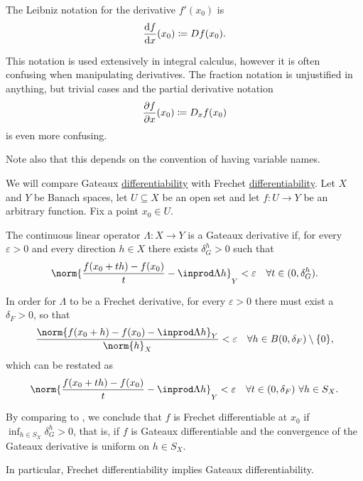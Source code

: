 \begin{remark}
\begin{thmenum}
     The Leibniz notation for the derivative \( f'(x_0) \) is
    \begin{equation*}
      \diff f x (x_0) \coloneqq D f(x_0).
    \end{equation*}

    This notation is used extensively in integral calculus, however it is often confusing when manipulating derivatives. The fraction notation is unjustified in anything, but trivial cases and the partial derivative notation
    \begin{equation*}
      \diffp f x (x_0) \coloneqq D_x f(x_0)
    \end{equation*}
    is even more confusing.

    Note also that this depends on the convention of having variable names.
  \end{thmenum}
\end{remark}

\begin{remark}\label{rem:gateaux_vs_frechet}
  We will compare Gateaux \hyperref[def:differentiability/gateaux]{differentiability} with Frechet \hyperref[def:differentiability/frechet]{differentiability}. Let \( X \) and \( Y \) be Banach spaces, let \( U \subseteq X \) be an open set and let \( f: U \to Y \) be an arbitrary function. Fix a point \( x_0 \in U \).

  The continuous linear operator \( \Lambda: X \to Y \) is a Gateaux derivative if, for every \( \varepsilon > 0 \) and every direction \( h \in X \) there exists \( \delta_G^h > 0 \) such that
  \begin{equation}\label{rem:gateaux_vs_frechet/gateaux}
    \norm{\frac {f(x_0 + th) - f(x_0)} t - \inprod \Lambda h}_Y < \varepsilon \quad\forall t \in (0, \delta_G^h).
  \end{equation}

  In order for \( \Lambda \) to be a Frechet derivative, for every \( \varepsilon > 0 \) there must exist a \( \delta_F > 0 \), so that
  \begin{equation*}
    \frac{\norm{f(x_0 + h) - f(x_0) - \inprod \Lambda h}_Y} {\norm{h}_X} < \varepsilon \quad\forall h \in B(0, \delta_F) \setminus \{ 0 \},
  \end{equation*}
  which can be restated as
  \begin{equation}\label{rem:gateaux_vs_frechet/frechet}
    \norm{\frac {f(x_0 + th) - f(x_0)} t - \inprod \Lambda h}_Y < \varepsilon \quad\forall t \in (0, \delta_F) \ \forall h \in S_X.
  \end{equation}

  By comparing  to , we conclude that \( f \) is Frechet differentiable at \( x_0 \) if \( \inf_{h \in S_X} \delta^h_G > 0 \), that is, if \( f \) is Gateaux differentiable and the convergence of the Gateaux derivative is uniform on \( h \in S_X \).

  In particular, Frechet differentiability implies Gateaux differentiability.
\end{remark}


